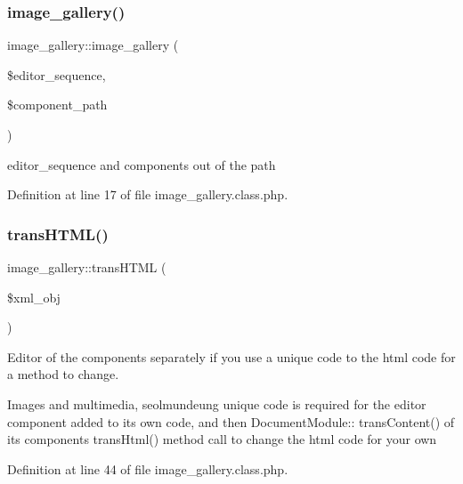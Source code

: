 \mbox{\label{classimage__gallery_a61f93b0e279db69d5476ed16ec428200}} 
\subsubsection{\texorpdfstring{image\+\_\+gallery()}{image\_gallery()}}
{\footnotesize\ttfamily image\+\_\+gallery\+::image\+\_\+gallery (\begin{DoxyParamCaption}\item[{}]{\$editor\+\_\+sequence,  }\item[{}]{\$component\+\_\+path }\end{DoxyParamCaption})}



editor\+\_\+sequence and components out of the path 



Definition at line 17 of file image\+\_\+gallery.\+class.\+php.

\mbox{\label{classimage__gallery_a7e147e64f848be078e9171b061dd70ad}} 
\subsubsection{\texorpdfstring{trans\+H\+T\+M\+L()}{transHTML()}}
{\footnotesize\ttfamily image\+\_\+gallery\+::trans\+H\+T\+ML (\begin{DoxyParamCaption}\item[{}]{\$xml\+\_\+obj }\end{DoxyParamCaption})}



Editor of the components separately if you use a unique code to the html code for a method to change. 

Images and multimedia, seolmundeung unique code is required for the editor component added to its own code, and then Document\+Module\+:\+: trans\+Content() of its components trans\+Html() method call to change the html code for your own 

Definition at line 44 of file image\+\_\+gallery.\+class.\+php.



